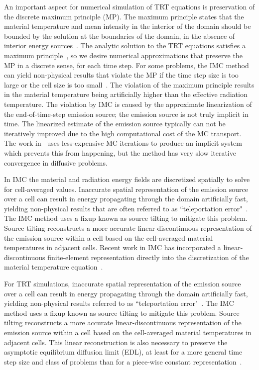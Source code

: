 An important aspect for numerical simulation of TRT equations is preservation of the
discrete maximum principle (MP). The maximum principle states that the material temperature and mean intensity in the
interior of the domain should be bounded by the solution at the boundaries of the domain, in the
absence of interior energy sources~\cite{wollaber2013discrete,larsen_mpv}.  The analytic solution to the TRT equations satisfies a maximum
principle~\cite{larsen_mpv}, so we desire numerical approximations that preserve the MP in
a discrete sense, for each time step. For some problems, the IMC method can yield non-physical results that violate the MP if the time
step size is too large or the cell size is too small~\cite{wollaber2013discrete}. The violation of the maximum principle results in the material temperature being artificially
higher than the effective radiation temperature. 
The violation by IMC is caused by the approximate linearization of the end-of-time-step emission source; the emission source
is not truly implicit in time. The linearized estimate of the emission source typically can not be iteratively improved due
to the high computational cost of the MC transport.   
 The work in~\cite{iimc_gentile} uses less-expensive MC
iterations to produce an implicit system which prevents this from happening, but the
method has very
slow iterative convergence in diffusive problems.  

In IMC the material and radiation energy fields are discretized spatially to solve for cell-averaged values.
Inaccurate spatial representation of the emission source over a cell can result in
energy propagating through the domain artificially fast, yielding non-physical
results that are often referred to as ``teleportation error"~\cite{teleportation}.  The IMC method uses a fixup known as source tilting
to mitigate this problem.  Source tilting reconstructs a more accurate
linear-discontinuous representation of the
emission source within a cell based on the cell-averaged material temperatures in adjacent
cells.  Recent work in IMC has incorporated a linear-discontinuous finite-element representation directly into 
the discretization of the material temperature equation~\cite{wollaeger_ld}.



For TRT simulations, inaccurate spatial representation of the emission source over a cell can result in
energy propagating through the domain artificially fast, yielding non-physical
results referred to as ``teleportation error"~\cite{teleportation}.  The IMC method uses a fixup known as source tilting
to mitigate this problem.  Source tilting reconstructs a more accurate
linear-discontinuous representation of the
emission source within a cell based on the cell-averaged material temperatures in adjacent
cells. This linear reconstruction is also necessary to preserve the asymptotic equilibrium diffusion
limit (EDL), at least for a more general time step size and class of problems than for a piece-wise constant representation~\cite{diff_limit_imc}.  

